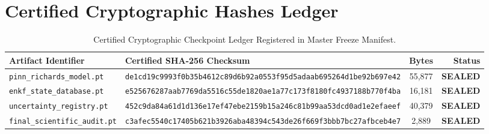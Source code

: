 \documentclass[11pt,a4paper]{article}
\theoremstyle{definition}
\theoremstyle{remark}
\begin{document}
\section{Certified Cryptographic Hashes Ledger}

\begin{table}[h!]
\centering
\scriptsize
\begin{tabular}{lp{6.5cm}cr}
\toprule
\textbf{Artifact Identifier} & \textbf{Certified SHA-256 Checksum} & \textbf{Bytes} & \textbf{Status} \\
\midrule
\texttt{pinn\_richards\_model.pt} & \texttt{de1cd19c9993f0b35b4612c89d6b92a0553f95d5adaab695264d1be92b697e42} & 55,877 & \textbf{SEALED} \\
\texttt{enkf\_state\_database.pt} & \texttt{e525676287aab7769da5516c55de1820ae1a77c173f8180fc4937188b770f4ba} & 16,181 & \textbf{SEALED} \\
\texttt{uncertainty\_registry.pt} & \texttt{452c9da84a61d1d136e17ef47ebe2159b15a246c81b99aa53dcd0ad1e2efaeef} & 40,379 & \textbf{SEALED} \\
\texttt{final\_scientific\_audit.pt} & \texttt{c3afec5540c17405b621b3926aba48394c543de26f669f3bbb7bc27afbceb4e7} & 2,889 & \textbf{SEALED} \\
\bottomrule
\end{tabular}
\caption{Certified Cryptographic Checkpoint Ledger Registered in Master Freeze Manifest.}
\label{tab:hash_ledger}
\end{table}
\end{document}
